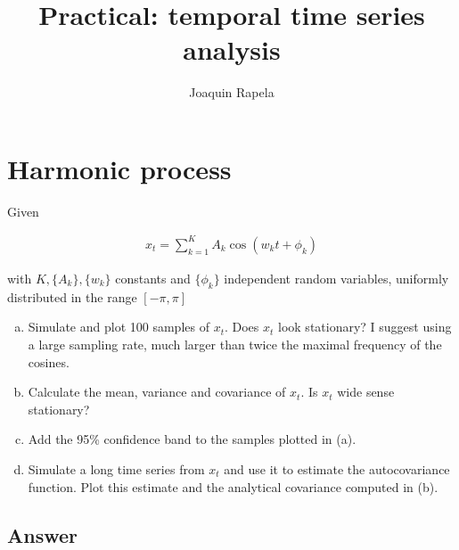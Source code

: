 \documentclass[12pt]{article}
\title{Practical: temporal time series analysis}
\author{Joaquin Rapela}
\begin{document}
\maketitle

\section{Harmonic process}

Given 

\begin{align*}
    x_t=\sum_{k=1}^KA_k\cos(w_kt+\phi_k)
\end{align*}

\noindent with $K, \{A_k\}, \{w_k\}$ constants and $\{\phi_k\}$ independent random
variables, uniformly distributed in the range $[-\pi,\pi]$

\begin{enumerate}[(a)]

    \item Simulate and plot 100 samples of $x_t$. Does $x_t$ look stationary? I
        suggest using a large sampling rate, much larger than twice the maximal
        frequency of the cosines.

    \item Calculate the mean, variance and covariance of $x_t$. Is $x_t$ wide
        sense stationary?

    \item Add the 95\% confidence band to the samples plotted in (a).

    \item Simulate a long time series from $x_t$ and use it to estimate the
        autocovariance function. Plot this estimate and the analytical
        covariance computed in (b).

\end{enumerate}

\pagebreak

\subsection*{Answer}
\end{document}

